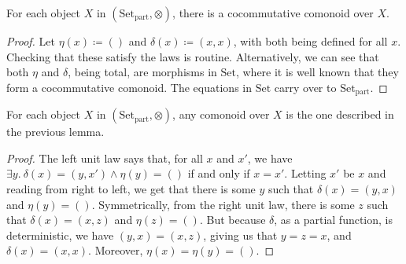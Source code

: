 \begin{lemma}
  For each object $X$ in $(\mathrm{Set}_{\mathrm{part}}, {\otimes})$, there is
  a cocommutative comonoid over $X$.
\end{lemma}
\begin{proof}
  Let $\eta(x) \coloneq ()$ and $\delta(x) \coloneq (x, x)$, with both
  being defined for all $x$.
  Checking that these satisfy the laws is routine.
  Alternatively, we can see that both $\eta$ and $\delta$, being total, are
  morphisms in $\mathrm{Set}$, where it is well known that they form a
  cocommutative comonoid.
  The equations in $\mathrm{Set}$ carry over to $\mathrm{Set}_{\mathrm{part}}$.
\end{proof}

\begin{lemma}
  For each object $X$ in $(\mathrm{Set}_{\mathrm{part}}, {\otimes})$, any
  comonoid over $X$ is the one described in the previous lemma.
\end{lemma}
\begin{proof}
  The left unit law says that, for all $x$ and $x'$, we have
  $\exists y.~\delta(x) = (y, x') \land \eta(y) = ()$ if and only if $x = x'$.
  Letting $x'$ be $x$ and reading from right to left, we get that there is
  some $y$ such that $\delta(x) = (y, x)$ and $\eta(y) = ()$.
  Symmetrically, from the right unit law, there is some $z$ such that
  $\delta(x) = (x, z)$ and $\eta(z) = ()$.
  But because $\delta$, as a partial function, is deterministic, we have
  $(y, x) = (x, z)$, giving us that $y = z = x$, and $\delta(x) = (x, x)$.
  Moreover, $\eta(x) = \eta(y) = ()$.
\end{proof}
